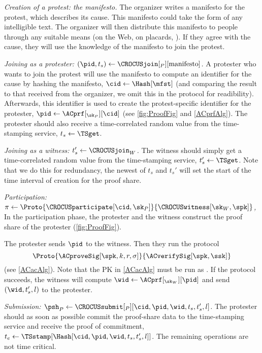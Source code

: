 \emph{Creation of a protest: the manifesto.}
The organizer writes a manifesto for the protest, which describes its cause.
This manifesto could take the form of any intelligible text.
The organizer will then distribute this manifesto to people through
any suitable means  (\eg on the Web, on placards, \etc).
If they agree with the cause, they will use the knowledge of the
manifesto to join the protest. 


\emph{Joining as a protester: \((\pid, t_s)\gets 
    \CROCUSjoin[_P][\text{manifesto}]\).}
A protester who wants to join the protest will use the manifesto to
compute an identifier for the cause by hashing the manifesto,
\(\cid\gets \Hash[\mfst]\) (and comparing the result to that received
from the organizer, we omit this in the protocol for readibility).
Afterwards, this identifier is used to create the protest-specific identifier 
for the protester, \(\pid\gets \ACprf[_{\sk_P}][\cid]\) (see 
\cref{fig:ProofFig} and \cref{ACprfAlg}).
The protester should also receive a time-correlated random value from the 
time-stamping service, \(t_s\gets \TSget\).


\emph{Joining as a witness: \(t_s'\gets \CROCUSjoin_W\).}
The witness should simply get a time-correlated random value from the time-stamping service, \(t_s'\gets \TSget\).
Note that we do this for redundancy, the newest of \(t_s\) and \(t_s'\) will 
set the start of the time interval of creation for the proof share.


\emph{Participation: \(\pi\gets
    \Proto{\CROCUSparticipate[\cid, \sk_P]}{\CROCUSwitness[\sk_W, \spk]}\),}
In the participation phase, the protester and 
the witness construct the proof share of the protester (\cref{fig:ProofFig}).

The protester sends \(\pid\) to the witness.
Then they run the protocol \[
  \Proto{\ACproveSig[\spk, k, r, \sigma]}{\ACverifySig[\spk, \ssk]}
\] (see \cref{ACacAlg}).
Note that the \ac{PK} in \cref{ACacAlg} must be run as .
If the protocol succeeds, the witness will compute \(\wid \gets 
  \ACprf[_{\sk_W}][\pid]\) and send \((\wid, t_s', l)\) to the protester.


\emph{Submission: \(\psh_P\gets \CROCUSsubmit[_P][\cid, \pid, \wid, t_s, t_s',  l]\).}
The protester should as soon as possible commit the proof-share data to the 
time-stamping service and receive the proof of commitment, \(t_e\gets 
  \TSstamp[\Hash[\cid, \pid, \wid, t_s, t_s', l]]\).
The remaining operations are not time critical.

